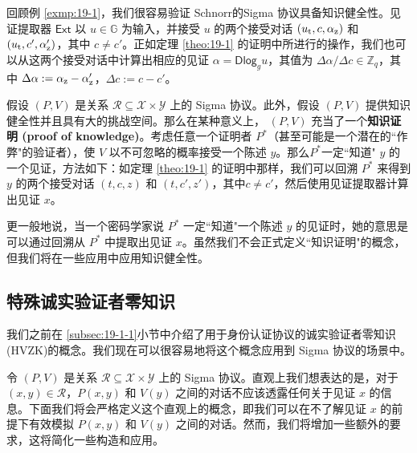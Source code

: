 \begin{example}\label{exmp:19-2}
回顾例 \ref{exmp:19-1}，我们很容易验证 Schnorr的Sigma 协议具备知识健全性。见证提取器 $\mathsf{Ext}$ 以 $u\in\mathbb{G}$ 为输入，并接受 $u$ 的两个接受对话 $(u_{\rm t},c,\alpha_{\rm z})$ 和 $(u_{\rm t},c',\alpha_{\rm z}')$，其中 $c\neq c'$。正如定理 \ref{theo:19-1} 的证明中所进行的操作，我们也可以从这两个接受对话中计算出相应的见证 $\alpha=\mathsf{Dlog}_gu$，其值为 ${\Delta\alpha}/{\Delta c}\in\mathbb{Z}_q$，其中 $\Delta\alpha:=\alpha_{\rm z}-\alpha_{\rm z}'$，$\Delta c:=c-c'$。
\end{example}

假设 $(P,V)$ 是关系 $\mathcal{R}\subseteq\mathcal{X}×\mathcal{Y}$ 上的 Sigma 协议。此外，假设 $(P,V)$ 提供知识健全性并且具有大的挑战空间。那么在某种意义上， $(P,V)$ 充当了一个\textbf{知识证明 (proof of knowledge)}。考虑任意一个证明者 $P^*$（甚至可能是一个潜在的``作弊"的验证者），使 $V$ 以不可忽略的概率接受一个陈述 $y$。那么$P^*$一定``知道" $y$ 的一个见证，方法如下：如定理 \ref{theo:19-1} 的证明中那样，我们可以回溯 $P^*$ 来得到 $y$ 的两个接受对话 $(t,c,z)$ 和 $(t,c',z')$，其中$c\neq c'$，然后使用见证提取器计算出见证 $x$。

更一般地说，当一个密码学家说 $P^*$ 一定``知道"一个陈述 $y$ 的见证时，她的意思是可以通过回溯从 $P^*$ 中提取出见证 $x$。虽然我们不会正式定义``知识证明"的概念，但我们将在一些应用中应用知识健全性。

\subsection{特殊诚实验证者零知识}

我们之前在 \ref{subsec:19-1-1}小节中介绍了用于身份认证协议的诚实验证者零知识(HVZK)的概念。我们现在可以很容易地将这个概念应用到 Sigma 协议的场景中。 

令 $(P,V)$ 是关系 $\mathcal{R}\subseteq\mathcal{X}×\mathcal{Y}$ 上的 Sigma 协议。直观上我们想表达的是，对于 $(x,y)\in\mathcal{R}$，$P(x,y)$ 和 $V(y)$ 之间的对话不应该透露任何关于见证 $x$ 的信息。下面我们将会严格定义这个直观上的概念，即我们可以在不了解见证 $x$ 的前提下有效模拟 $P(x,y)$ 和 $V(y)$ 之间的对话。然而，我们将增加一些额外的要求，这将简化一些构造和应用。

